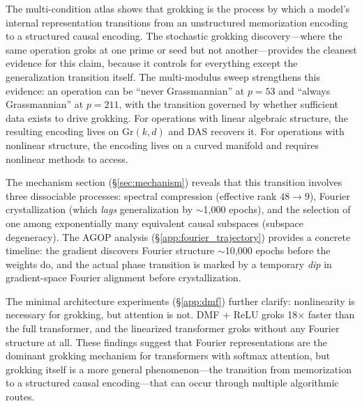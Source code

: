 \documentclass{article}
\newcommand{\Gr}{\mathrm{Gr}}
\begin{document}
The multi-condition atlas shows that grokking is the process by which a model's
internal representation transitions from an unstructured memorization encoding to
a structured causal encoding. The stochastic grokking discovery---where the same
operation groks at one prime or seed but not another---provides the cleanest
evidence for this claim, because it controls for everything except the
generalization transition itself. The multi-modulus sweep strengthens this
evidence: an operation can be ``never Grassmannian'' at $p{=}53$ and ``always
Grassmannian'' at $p{=}211$, with the transition governed by whether sufficient
data exists to drive grokking. For operations with linear algebraic structure,
the resulting encoding lives on $\Gr(k,d)$ and DAS recovers it. For operations
with nonlinear structure, the encoding lives on a curved manifold and requires
nonlinear methods to access.

The mechanism section (\S\ref{sec:mechanism}) reveals that this transition
involves three dissociable processes: spectral compression (effective rank
$48 \to 9$), Fourier crystallization (which \emph{lags} generalization by
$\sim$1{,}000 epochs), and the selection of one among exponentially many
equivalent causal subspaces (subspace degeneracy). The AGOP analysis
(\S\ref{app:fourier_trajectory}) provides a concrete timeline: the gradient
discovers Fourier structure $\sim$10{,}000 epochs before the weights do,
and the actual phase transition is marked by a temporary \emph{dip} in
gradient-space Fourier alignment before crystallization.

The minimal architecture experiments (\S\ref{app:dmf}) further clarify:
nonlinearity is necessary for grokking, but attention is not. DMF + ReLU
groks 18$\times$ faster than the full transformer, and the linearized
transformer groks without any Fourier structure at all. These findings
suggest that Fourier representations are the dominant grokking mechanism
for transformers with softmax attention, but grokking itself is a more
general phenomenon---the transition from memorization to a structured
causal encoding---that can occur through multiple algorithmic routes.
\end{document}
